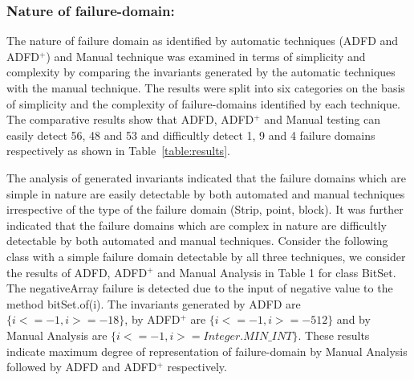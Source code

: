 \subsubsection{Nature of failure-domain:}
The nature of failure domain as identified by automatic techniques (ADFD and ADFD$^+$) and Manual technique was examined in terms of simplicity and complexity by comparing the invariants generated by the automatic techniques with the manual technique. The results were split into six categories on the basis of simplicity and the complexity of failure-domains identified by each technique. The comparative results show that ADFD, ADFD$^+$ and Manual testing can easily detect 56, 48 and 53 and difficultly detect 1, 9 and 4 failure domains respectively as shown in Table~\ref{table:results}.

The analysis of generated invariants indicated that the failure domains which are simple in nature are easily detectable by both automated and manual techniques irrespective of the type of the failure domain (Strip, point, block). It was further indicated that the failure domains which are complex in nature are difficultly detectable by both automated and manual techniques. %
Consider the following class with a simple failure domain detectable by all three techniques, we consider the results of ADFD, ADFD$^+$ and Manual Analysis in Table 1 for class BitSet. The negativeArray failure is detected due to the input of negative value to the method bitSet.of(i). The invariants generated by ADFD are $\{i <= -1, i >= -18\}$, by ADFD$^+$ are $\{i <= -1, i >= -512\}$ and by Manual Analysis are $\{i <= -1, i >= Integer.MIN\_INT\}$. These results indicate maximum degree of representation of failure-domain by Manual Analysis followed by ADFD and ADFD$^+$ respectively.





